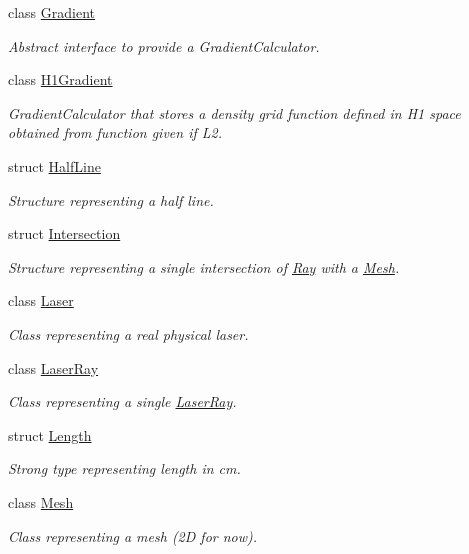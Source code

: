 \begin{DoxyCompactItemize}
class \hyperlink{classraytracer_1_1Gradient}{Gradient}
\begin{DoxyCompactList}\small\item\em Abstract interface to provide a Gradient\+Calculator. \end{DoxyCompactList}\item 
class \hyperlink{classraytracer_1_1H1Gradient}{H1\+Gradient}
\begin{DoxyCompactList}\small\item\em Gradient\+Calculator that stores a density grid function defined in H1 space obtained from function given if L2. \end{DoxyCompactList}\item 
struct \hyperlink{structraytracer_1_1HalfLine}{Half\+Line}
\begin{DoxyCompactList}\small\item\em Structure representing a half line. \end{DoxyCompactList}\item 
struct \hyperlink{structraytracer_1_1Intersection}{Intersection}
\begin{DoxyCompactList}\small\item\em Structure representing a single intersection of \hyperlink{classraytracer_1_1Ray}{Ray} with a \hyperlink{classraytracer_1_1Mesh}{Mesh}. \end{DoxyCompactList}\item 
class \hyperlink{classraytracer_1_1Laser}{Laser}
\begin{DoxyCompactList}\small\item\em Class representing a real physical laser. \end{DoxyCompactList}\item 
class \hyperlink{classraytracer_1_1LaserRay}{Laser\+Ray}
\begin{DoxyCompactList}\small\item\em Class representing a single \hyperlink{classraytracer_1_1LaserRay}{Laser\+Ray}. \end{DoxyCompactList}\item 
struct \hyperlink{structraytracer_1_1Length}{Length}
\begin{DoxyCompactList}\small\item\em Strong type representing length in cm. \end{DoxyCompactList}\item 
class \hyperlink{classraytracer_1_1Mesh}{Mesh}
\begin{DoxyCompactList}\small\item\em Class representing a mesh (2D for now). \end{DoxyCompactList}\item 

\end{DoxyCompactItemize}
